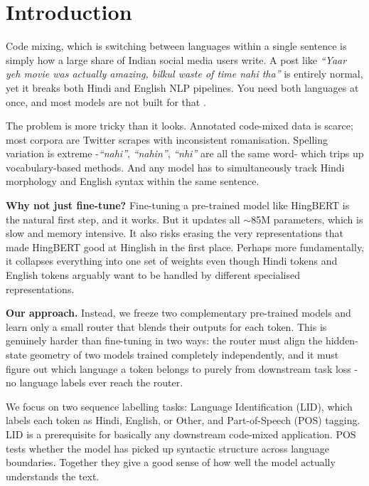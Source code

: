 \documentclass[conference]{IEEEtran}
\begin{document}
\section{Introduction}

Code mixing, which is switching between languages within a single sentence is simply how a large share of Indian social media users write. A post like \textit{``Yaar yeh movie was actually amazing, bilkul waste of time nahi tha''} is entirely normal, yet it breaks both Hindi and English NLP pipelines. You need both languages at once, and most models are not built for that \cite{nayak2022hingbert,aguilar2020lince}.

The problem is more tricky than it looks. Annotated code-mixed data is scarce; most corpora are Twitter scrapes with inconsistent romanisation. Spelling variation is extreme -\textit{``nahi''}, \textit{``nahin''}, \textit{``nhi''} are all the same word- which trips up vocabulary-based methods. And any model has to simultaneously track Hindi morphology and English syntax within the same sentence.

\textbf{Why not just fine-tune?} Fine-tuning a pre-trained model like HingBERT is the natural first step, and it works. But it updates all $\sim$85M parameters, which is slow and memory intensive. It also risks erasing the very representations that made HingBERT good at Hinglish in the first place. Perhaps more fundamentally, it collapses everything into one set of weights even though Hindi tokens and English tokens arguably want to be handled by different specialised representations.

\textbf{Our approach.} Instead, we freeze two complementary pre-trained models and learn only a small router that blends their outputs for each token. This is genuinely harder than fine-tuning in two ways: the router must align the hidden-state geometry of two models trained completely independently, and it must figure out which language a token belongs to purely from downstream task loss -no language labels ever reach the router.

We focus on two sequence labelling tasks: Language Identification (LID), which labels each token as Hindi, English, or Other, and Part-of-Speech (POS) tagging. LID is a prerequisite for basically any downstream code-mixed application. POS tests whether the model has picked up syntactic structure across language boundaries. Together they give a good sense of how well the model actually understands the text.
\end{document}
